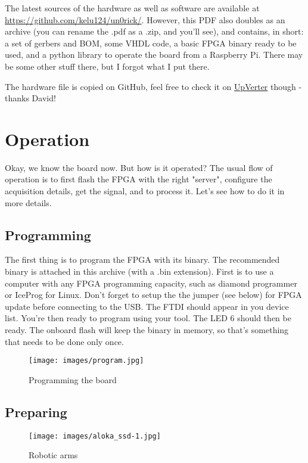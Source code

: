 \documentclass{article}
\begin{document}
The latest sources of the hardware as well as software are available at \url{https://github.com/kelu124/un0rick/}. However, this PDF also doubles as an archive (you can rename the .pdf as a .zip, and you'll see), and contains, in short: a set of gerbers and BOM, some VHDL code, a basic FPGA binary ready to be used, and a python library to operate the board from a Raspberry Pi. There may be some other stuff there, but I forgot what I put there.

The hardware file is copied on GitHub, feel free to check it on \href{https://upverter.com/design/kelu124/c59550d3e0dcf944/un0rick-v11/}{UpVerter} though - thanks David!

\section{Operation} 

Okay, we know the board now. But how is it operated? The usual flow of operation is to first flash the FPGA with the right "server", configure the acquisition details, get the signal, and to process it. Let's see how to do it in more details.
 
\subsection{Programming} 

The first thing is to program the FPGA with its binary. The recommended binary is attached in this archive (with a .bin extension). First is to use a computer with any FPGA programming capacity, such as diamond programmer or IceProg for Linux. Don't forget to setup the the jumper (see below) for FPGA update before connecting to the USB. The FTDI should appear in you device list. You're then ready to program using your tool. The LED 6 should then be ready. The onboard flash will keep the binary in memory, so that's something that needs to be done only once.

\begin{figure}[h!]
\centering
  \texttt{[image: images/program.jpg]}
  \caption{Programming the board}
  \label{fig:program}
\end{figure}

\subsection{Preparing} 

\begin{wrapfigure}{r}{0.25\textwidth}
  \vspace{-20pt}
  \begin{center}
    \texttt{[image: images/aloka\_ssd-1.jpg]}
  \end{center}
    \vspace{-13pt}
  \caption{Robotic arms}
  \vspace{-55pt}
\end{wrapfigure}
\end{document}
